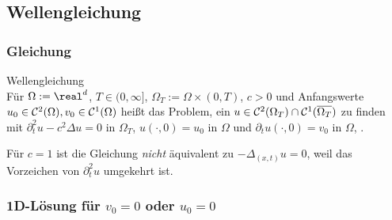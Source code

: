\pagebreak

\subsection{%
    Wellengleichung%
}

\subsubsection{%
    Gleichung%
}

\begin{Def}{Wellengleichung}\\
    Für $\Omega := \real^d$, $T \in (0, \infty]$, $\Omega_T := \Omega \times (0, T)$,
    $c > 0$ und Anfangswerte $u_0 \in \mathcal{C}^2(\Omega), v_0 \in \mathcal{C}^1(\Omega)$ heißt
    das Problem, ein $u \in \mathcal{C}^2(\Omega_T) \cap \mathcal{C}^1(\overline{\Omega_T})$ zu finden mit
    $\partial_t^2 u - c^2 \Delta u = 0$ in $\Omega_T$,
    $u(\cdot, 0) = u_0$ in $\Omega$ und
    $\partial_t u(\cdot, 0) = v_0$ in $\Omega$,
    .
\end{Def}

\begin{Bem}
    Für $c = 1$ ist die Gleichung \emph{nicht} äquivalent zu $-\Delta_{(x,t)} u = 0$,
    weil das Vorzeichen von $\partial_t^2 u$ umgekehrt ist.
\end{Bem}

\subsubsection{%
    1D-Lösung für \texorpdfstring{$v_0 = 0$}{v₀ = 0} oder \texorpdfstring{$u_0 = 0$}{u₀ = 0}%
}

